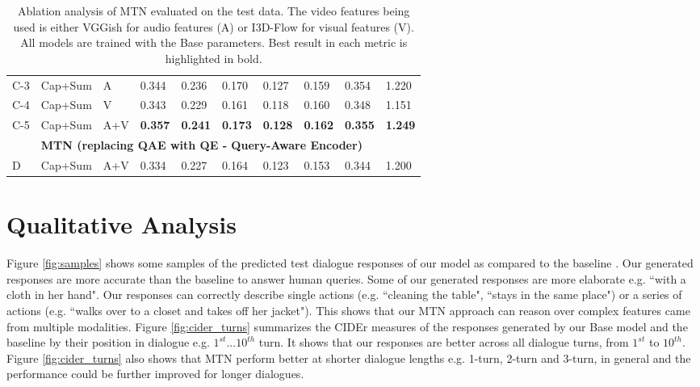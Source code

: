 \documentclass[11pt,a4paper]{article}
\begin{document}
\begin{table*}[htbp]
{\begin{tabular}{p{0.1cm}p{1.2cm}llllllll}
\multicolumn{1}{c}{C-3}                                         & Cap+Sum               & A               & 0.344          & 0.236          & 0.170          & 0.127          & 0.159           & 0.354            & 1.220          \\ 
\multicolumn{1}{c}{C-4}                                         & Cap+Sum               & V               & 0.343          & 0.229          & 0.161          & 0.118          & 0.160           & 0.348            & 1.151          \\  
\multicolumn{1}{c}{C-5}                                         & Cap+Sum               & A+V             & \textbf{0.357}          & \textbf{0.241}          & \textbf{0.173}          & \textbf{0.128}          & \textbf{0.162}           & \textbf{0.355}            & \textbf{1.249}          \\ \hline
                                         & \multicolumn{9}{l}{\textbf{MTN (replacing QAE with QE - Query-Aware Encoder)}}                                                                                         \\ \hline
D                                      & Cap+Sum               & A+V             & 0.334          & 0.227          & 0.164          & 0.123          & 0.153           & 0.344            & 1.200          \\ \hline
\end{tabular}
    }
	\caption{Ablation analysis of MTN evaluated on the test data. The video features being used is either VGGish for audio features (A) or I3D-Flow for visual features (V). All models are trained with the Base parameters. Best result in each metric is highlighted in bold.}
	\label{tab:ablation}
\end{table*}

\section{Qualitative Analysis}

Figure \ref{fig:samples} shows some samples of the predicted test dialogue responses of our model as compared to the baseline \cite{hori2018end}. Our generated responses are more accurate than the baseline to answer human queries. Some of our generated responses are more elaborate e.g. ``with a cloth in her hand". Our responses can correctly describe single actions (e.g. ``cleaning the table", ``stays in the same place") or a series of actions (e.g. ``walks over to a closet and takes off her jacket"). This shows that our MTN approach can reason over complex features came from multiple modalities. Figure \ref{fig:cider_turns} summarizes the CIDEr measures of the responses generated by our Base model and the baseline \cite{hori2018end} by their position in dialogue e.g. $1^{st}...10^{th}$ turn. It shows that our responses are better across all dialogue turns, from $1^{st}$ to $10^{th}$. Figure \ref{fig:cider_turns} also shows that MTN perform better at shorter dialogue lengths e.g. 1-turn, 2-turn and 3-turn, in general and the performance could be further improved for longer dialogues. 
\end{document}
